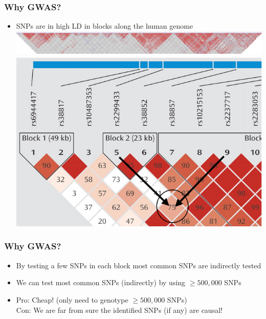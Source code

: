 \documentclass[xcolor=pdftex,dvipsnames,table,10pt]{beamer}
\begin{document}
\begin{frame}
  \frametitle{Why GWAS?}
\vspace{-.1cm}
    \begin{itemize}
    \item SNPs are in high LD in blocks along the human genome\\\vspace{0.2cm}
            \includegraphics[scale=.16]{ldBlock.png}\\\vspace{0.15cm}
        \includegraphics[scale=.24,trim = 0mm 0mm 0mm 30mm, clip]{reading_LD_blocks.png}\\\vspace{0.15cm}
       \end{itemize}  
\end{frame}


\begin{frame}
  \frametitle{Why GWAS?}
\vspace{-.1cm}
    \begin{itemize}
          \item<1-> By testing a few SNPs in each block most common SNPs are indirectly tested
   \item<2-> We can test most common SNPs (indirectly) by using $\geq500,000$ SNPs
   \item<3-> Pro: Cheap! (only need to genotype $\geq500,000$ SNPs) \\
   Con: We are far from sure the identified SNPs (if any) are causal!  
       \end{itemize}  
\end{frame}
\end{document}
